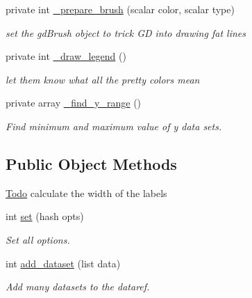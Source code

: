 \begin{DoxyCompactItemize}
private int \hyperlink{classChart_1_1Direction_aa40aa25ffd6c9005303642e1d0ce1ae6}{\_\-prepare\_\-brush} (scalar color, scalar type)
\begin{DoxyCompactList}\small\item\em set the gdBrush object to trick GD into drawing fat lines \item\end{DoxyCompactList}\item 
private int \hyperlink{classChart_1_1Direction_a47ab5b61307d24d038ae77e62e269099}{\_\-draw\_\-legend} ()
\begin{DoxyCompactList}\small\item\em let them know what all the pretty colors mean \item\end{DoxyCompactList}\item 
private array \hyperlink{classChart_1_1Direction_a8f408c9fa61c3ee5f87a19c1f42d94c7}{\_\-find\_\-y\_\-range} ()
\begin{DoxyCompactList}\small\item\em Find minimum and maximum value of y data sets. \item\end{DoxyCompactList}\end{DoxyCompactItemize}
\subsection*{Public Object Methods}
\label{_amgrpfb74d91261823cc595bbeff1eff2b9d5}
\begin{Desc}
\item[\hyperlink{todo__todo000001}{Todo}]calculate the width of the labels \end{Desc}
\begin{DoxyCompactItemize}
\item 
int \hyperlink{classChart_1_1Direction_ab7104b48aa4219a995656088c121078d}{set} (hash opts)
\begin{DoxyCompactList}\small\item\em Set all options. \item\end{DoxyCompactList}\item 
int \hyperlink{classChart_1_1Direction_a50b338ce75f7e6ab339b5f587a4e933b}{add\_\-dataset} (list data)
\begin{DoxyCompactList}\small\item\em Add many datasets to the dataref. \item\end{DoxyCompactList}\end{DoxyCompactItemize}
